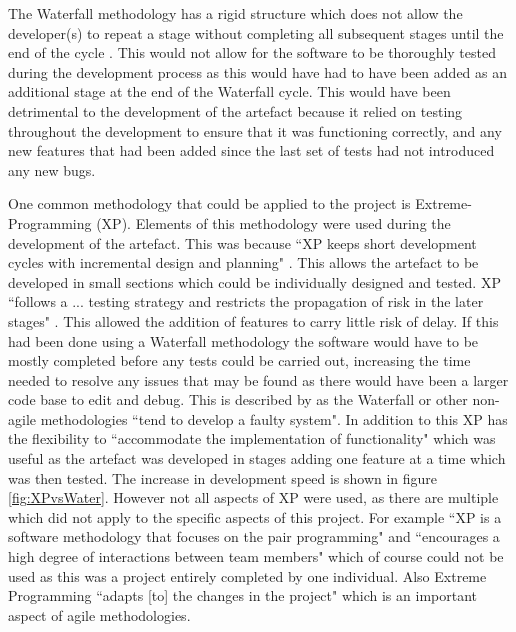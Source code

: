 \documentclass[11pt,a4paper]{report}
\begin{document}
The Waterfall methodology has a rigid structure which does not allow the developer(s) to repeat a stage without completing all subsequent stages until the end of the cycle \citep{WaterfallPresentation}. This would not allow for the software to be thoroughly tested during the development process as this would have had to have been added as an additional stage at the end of the Waterfall cycle. This would have been detrimental to the development of the artefact because it relied on testing throughout the development to ensure that it was functioning correctly, and any new features that had been added since the last set of tests had not introduced any new bugs.

One common methodology that could be applied to the project is Extreme-Programming (XP). Elements of this methodology were used during the development of the artefact. This was because ``XP keeps short development cycles with incremental design and planning" \citep{XPsharma2016analysis}. This allows the artefact to be developed in small sections which could be individually designed and tested. XP ``follows a ... testing strategy and restricts the propagation of risk in the later stages" \citep{XPsharma2016analysis}. This allowed the addition of features to carry little risk of delay. If this had been done using a Waterfall methodology the software would have to be mostly completed before any tests could be carried out, increasing the time needed to resolve any issues that may be found as there would have been a larger code base to edit and debug. This is described by \cite{XPsharma2016analysis} as the Waterfall or other non-agile methodologies ``tend to develop a faulty system". In addition to this XP has the flexibility to ``accommodate the implementation of functionality" \citep{XPsharma2016analysis} which was useful as the artefact was developed in stages adding one feature at a time which was then tested. The increase in development speed is shown in figure \ref{fig:XPvsWater}. However not all aspects of XP were used, as there are multiple which did not apply to the specific aspects of this project. For example ``XP is a software methodology that focuses on the pair programming" and ``encourages a high degree of interactions between team members" \citep{XPsharma2016analysis} which of course could not be used as this was a project entirely completed by one individual. Also Extreme Programming ``adapts [to] the changes in the project" which is an important aspect of agile methodologies.
\end{document}
